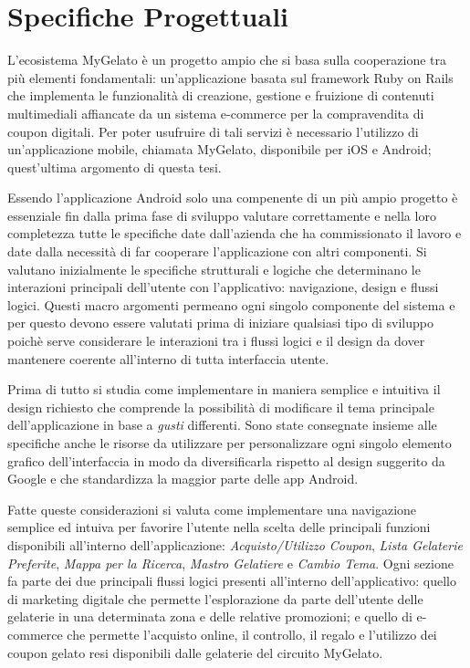 \section{Specifiche Progettuali}

L'ecosistema MyGelato è un progetto ampio che si basa sulla cooperazione tra più elementi fondamentali: un’applicazione basata sul framework Ruby on Rails che implementa le funzionalità di creazione, gestione e fruizione di contenuti multimediali affiancate da un sistema e-commerce per la compravendita di coupon digitali.
Per poter usufruire di tali servizi è necessario l'utilizzo di un'applicazione mobile, chiamata MyGelato, disponibile per iOS e Android; quest'ultima argomento di questa tesi.

Essendo l'applicazione Android solo una compenente di un più ampio progetto è essenziale fin dalla prima fase di sviluppo valutare correttamente e nella loro completezza tutte le specifiche date dall'azienda che ha commissionato il lavoro e date dalla necessità di far cooperare l'applicazione con altri componenti.
Si valutano inizialmente le specifiche strutturali e logiche che determinano le interazioni principali dell'utente con l'applicativo: navigazione, design e flussi logici.
Questi macro argomenti permeano ogni singolo componente del sistema e per questo devono essere valutati prima di iniziare qualsiasi tipo di sviluppo poichè serve considerare le interazioni tra i flussi logici e il design da dover mantenere coerente all'interno di tutta interfaccia utente.

Prima di tutto si studia come implementare in maniera semplice e intuitiva il design richiesto che comprende la possibilità di modificare il tema principale dell'applicazione in base a \textit{gusti} differenti.
Sono state consegnate insieme alle specifiche anche le risorse da utilizzare per personalizzare ogni singolo elemento grafico dell'interfaccia in modo da diversificarla rispetto al design suggerito da Google e che standardizza la maggior parte delle app Android.

Fatte queste considerazioni si valuta come implementare una navigazione semplice ed intuiva per favorire l'utente nella scelta delle principali funzioni disponibili all'interno dell'applicazione: \textit{Acquisto/Utilizzo Coupon}, \textit{Lista Gelaterie Preferite}, \textit{Mappa per la Ricerca}, \textit{Mastro Gelatiere} e \textit{Cambio Tema}.
Ogni sezione fa parte dei due principali flussi logici presenti all'interno dell'applicativo: quello di marketing digitale che permette l'esplorazione da parte dell'utente delle gelaterie in una determinata zona e delle relative promozioni; e quello di e-commerce che permette l'acquisto online, il controllo, il regalo e l'utilizzo dei coupon gelato resi disponibili dalle gelaterie del circuito MyGelato.

